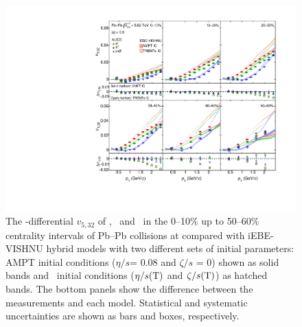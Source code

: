 \begin{figure}[h]
\begin{center}
\includegraphics[scale=0.73]{figures/model/TrentoAndAMPT_v523_gap00_PID2.pdf}
\end{center}
\caption{The \pT-differential $v_{5,32}$ of \pion, \kaon~and \proton~in the 0--10\% up to 50--60\% centrality intervals of Pb--Pb collisions at \sNN compared with iEBE-VISHNU hybrid models with two different sets of initial parameters: AMPT initial conditions ($\eta/s$= 0.08 and $\zeta/s$ = 0) shown as solid bands and \trento~initial conditions ($\eta/s({\rm T})$ and $\zeta/s({\rm T})$) as hatched bands. The bottom panels show the difference between the measurements and each model. Statistical and systematic uncertainties are shown as bars and boxes, respectively.}
\label{v523_model}
\end{figure}


